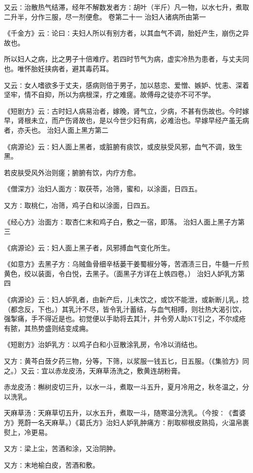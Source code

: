 \documentclass[a4paper,12pt,UTF8,twoside]{ctexbook}
\begin{document}
又云∶治散热气结滞，经年不解数发者方∶胡叶（半斤）凡一物，以水七升，煮取二升半，分作三服，尽一剂便愈。
卷第二十一
治妇人诸病所由第一

《千金方》云∶论曰∶夫妇人所以有别方者，以其血气不调，胎妊产生，崩伤之异故也。

所以妇人之病，比之男子十倍难疗。若四时节气为病，虚实冷热为患者，与丈夫同也。唯怀胎妊挟病者，避其毒药耳。

又云∶女人嗜欲多于丈夫，感病则倍于男子，加以慈恋、爱憎、嫉妒、忧恚、深着坚牢，情不自抑，所以为病根深，疗之难瘥。故傅母之徒亦不可不学。

《短剧方》云∶古时妇人病易治者，嫁晚，肾气立，少病，不甚有伤故也。今时嫁早，肾根未立，而产伤肾故也，是以今世少妇有病，必难治也。早嫁早经产虽无病者，亦夭也。
治妇人面上黑方第二

《病源论》云∶妇人面上黑者，或脏腑有痰饮，或皮肤受风邪，血气不调，致生黑。

若皮肤受风外治则瘥；腑腑有饮，内疗方愈。

《僧深方》治妇人面方∶取茯苓，冶筛，蜜和，以涂面，日四五。

又方∶取桃仁，冶筛，鸡子白和以涂面，日四五。

《经心方》治面方∶取杏仁末和鸡子白，敷之一宿，即落。
治妇人面上黑子方第三

《病源论》云∶妇人面上黑子者，风邪搏血气变化所生。

《如意方》去黑子方∶乌贼鱼骨细辛栝蒌干姜蜀椒分等，苦酒渍三日，牛髓一斤煎黄色，绞以装面，令白悦，去黑子。（面黑子方详在上帙四卷。）
治妇人妒乳方第四

《病源论》云∶妇人妒乳者，由新产后，儿未饮之，或饮不能泄，或新断儿乳，捻（都念反，下也。）其乳汁不尽，皆令乳汁蓄结，与血气相搏，则壮热大渴引饮，强掣痛，手不得近是也。初觉便以手助将去其汁，并令旁人助KT引之，不尔成疮有脓，其热势盛则结变成痈。

《短剧方》治妒乳方∶以鸡子白和小豆散涂乳房，令冷以消结也。

又方∶黄芩白蔹夕药三物，分等，下筛，以浆服一钱五匕，日五服。（《集验方》同之。）又云∶宜以赤龙皮汤，天麻草汤洗之，敷黄连胡粉膏。

赤龙皮汤∶槲树皮切三升，以水一斗，煮取一斗五升，夏月冷用之，秋冬温之，分以洗乳。

天麻草汤∶天麻草切五升，以水五升，煮取一斗，随寒温分洗乳。（今按∶《耆婆方》茺蔚一名天麻草。）《葛氏方》治妇人妒乳肿痛方∶削取柳根皮熟捣，火温帛裹熨上，冷更易。

又方∶梁上尘，苦酒和涂，又治阴肿。

又方∶末地榆白皮，苦酒和敷。
\end{document}
